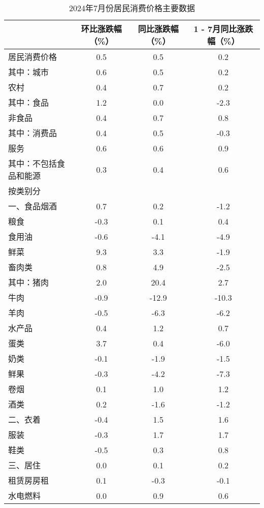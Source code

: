\begin{table}[h]
    \centering
    \caption{2024年7月份居民消费价格主要数据}
    \begin{tabular}{lccc}
        \toprule
        & 环比涨跌幅（\%） & 同比涨跌幅（\%） & 1 - 7月同比涨跌幅（\%） \\
        \midrule
        居民消费价格 & 0.5 & 0.5 & 0.2 \\
        其中：城市 & 0.6 & 0.5 & 0.2 \\
        农村 & 0.4 & 0.7 & 0.2 \\
        其中：食品 & 1.2 & 0.0 & -2.3 \\
        非食品 & 0.4 & 0.7 & 0.8 \\
        其中：消费品 & 0.4 & 0.5 & -0.3 \\
        服务 & 0.6 & 0.6 & 0.9 \\
        其中：不包括食品和能源 & 0.3 & 0.4 & 0.6 \\
        \midrule
        按类别分 & & & \\
        一、食品烟酒 & 0.7 & 0.2 & -1.2 \\
        粮食 & -0.3 & 0.1 & 0.4 \\
        食用油 & -0.6 & -4.1 & -4.9 \\
        鲜菜 & 9.3 & 3.3 & -1.9 \\
        畜肉类 & 0.8 & 4.9 & -2.5 \\
        其中：猪肉 & 2.0 & 20.4 & 2.7 \\
        牛肉 & -0.9 & -12.9 & -10.3 \\
        羊肉 & -0.5 & -6.3 & -6.2 \\
        水产品 & 0.4 & 1.2 & 0.7 \\
        蛋类 & 3.7 & 0.4 & -6.0 \\
        奶类 & -0.1 & -1.9 & -1.5 \\
        鲜果 & -0.3 & -4.2 & -7.3 \\
        卷烟 & 0.1 & 1.0 & 1.2 \\
        酒类 & 0.2 & -1.6 & -1.2 \\
        \midrule
        二、衣着 & -0.4 & 1.5 & 1.6 \\
        服装 & -0.3 & 1.7 & 1.7 \\
        鞋类 & -0.5 & 0.3 & 0.8 \\
        \midrule
        三、居住 & 0.0 & 0.1 & 0.2 \\
        租赁房房租 & 0.1 & -0.3 & -0.1 \\
        水电燃料 & 0.0 & 0.9 & 0.6 \\

\end{tabular}
\end{table}
